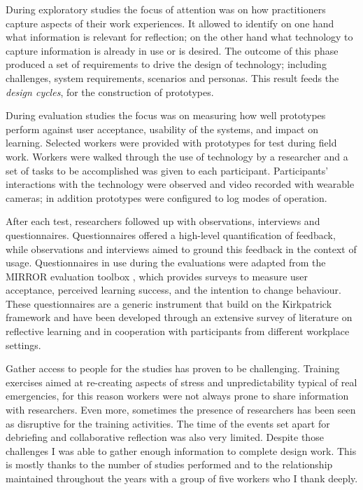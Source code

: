 During exploratory studies the focus of attention was on how practitioners capture aspects of their work experiences. It allowed to identify on one hand what information is relevant for reflection; on the other hand what technology to capture information is already in use or is desired. The outcome of this phase produced a set of requirements to drive the design of technology; including challenges, system requirements, scenarios and personas. This result feeds the \emph{design cycles}, for the construction of prototypes.

During evaluation studies the focus was on measuring how well prototypes perform against user acceptance, usability of the systems, and impact on learning. Selected workers were provided with prototypes for test during field work. Workers were walked through the use of technology by a researcher and a set of tasks to be accomplished was given to each participant. Participants' interactions with the technology were observed and video recorded with wearable cameras; in addition prototypes were configured to log modes of operation.

After each test, researchers followed up with observations, interviews and questionnaires. Questionnaires offered a high-level quantification of feedback, while observations and interviews aimed to ground this feedback in the context of usage. Questionnaires in use during the evaluations were adapted from the MIRROR evaluation toolbox \autocite{Knipfer:2012vi}, which provides surveys to measure user acceptance, perceived learning success, and the intention to change behaviour. These questionnaires are a generic instrument that build on the Kirkpatrick framework \autocite{kirkpatrick2009evaluating}  and have been developed through an extensive survey of literature on reflective learning and in cooperation with participants from different workplace settings.

Gather access to people for the studies has proven to be challenging. Training exercises aimed at re-creating aspects of stress and unpredictability typical of real emergencies, for this reason workers were not always prone to share information with researchers. Even more, sometimes the presence of researchers has been seen as disruptive for the training activities. The time of the events set apart for debriefing and collaborative reflection was also very limited. Despite those challenges I was able to gather enough information to complete  design work. This is mostly thanks to the number of studies performed and to the relationship maintained throughout the years with a group of five workers who I thank deeply.

